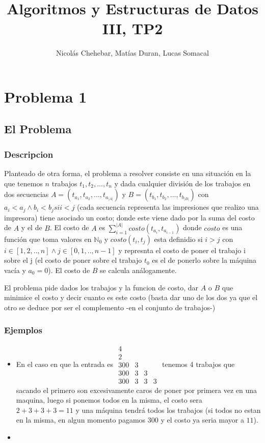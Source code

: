 \documentclass[A4paper,oneside,fleqn,10pt]{article}
\title{Algoritmos y Estructuras de Datos III, TP2}
\author{Nicolás Chehebar, Matías Duran, Lucas Somacal}
\date{}
\theoremstyle{definition}
\newcommand{\NN}{\mathbb{N}}
\begin{document}
\maketitle
\tableofcontents
\clearpage

\section{Problema 1}
\subsection{El Problema}

\subsubsection{Descripcion}
Planteado de otra forma, el problema a resolver consiste en una situación en la que tenemos $n$ trabajos $t_{1},t_{2},...,t_{n}$ y dada cualquier división de los trabajos en dos secuencias $A=(t_{a_{1}},t_{a_{2}},..., t_{a_{|A|}})$ y $B=(t_{b_{1}}, t_{b_{2}},...,t_{b_{|B|}})$  con $a_{i}<a_{j} \land b_{i}<b_{j} si i<j$ (cada secuencia representa las impresiones que realizo una impresora) tiene asociado un costo; donde este viene dado por la suma del costo de $A$ y el de $B$. El costo de $A$ es  $\sum_{i=1}^{|A|} costo (t_{a_{i}},t_{a_{i-1}})$  donde $costo$ es una función que toma valores en $\NN_{0}$ y $costo(t_{i},t_{j})$ esta definidio si $i>j$ con $i \in [1,2,..,n] \land j \in [0,1,..,n-1]$ y represnta el costo de poner el trabajo i sobre el j (el costo de poner sobre el trabajo $t_{0}$ es el de ponerlo sobre la máquina vacía y $a_{0}=0$). El costo de $B$ se calcula análogamente. 

El problema pide dados los trabajos y la funcion de costo, dar $A$ o $B$ que minimice el costo y decir cuanto es este costo (basta dar uno de los dos ya que el otro se deduce por ser el complemento -en el conjunto de trabajos-)
\subsubsection{Ejemplos}
\begin{itemize}
\item En el caso en que la entrada es $\begin{matrix}
  4 &  &  &  \\
  2 &  &  &  \\
  300 & 3 &  &  \\
  300 & 3 & 3 &  \\
  300 & 3 & 3 & 3 
\end{matrix}$ tenemos 4 trabajos que sacando el primero son excesivamente caros de poner por primera vez en una maquina, luego si ponemos todos en la misma, el costo sera $2+3+3+3=11$ y una máquina tendrá todos los trabajos (si todos no estan en la misma, en algun momento pagamos $300$ y el costo ya seria mayor a $11$).
\item
\end{itemize}
\end{document}
